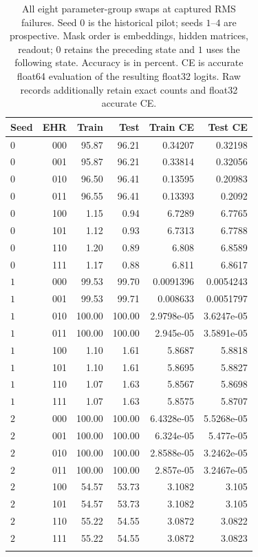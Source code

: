 \begin{table}[htbp]
\centering\small
\setlength{\tabcolsep}{4pt}
\caption{All eight parameter-group swaps at captured RMS failures. Seed $0$ is the historical pilot; seeds $1$--$4$ are prospective. Mask order is embeddings, hidden matrices, readout; $0$ retains the preceding state and $1$ uses the following state. Accuracy is in percent. CE is accurate float64 evaluation of the resulting float32 logits. Raw records additionally retain exact counts and float32 accurate CE.}
\label{tab:rms-swaps-1}
\begin{tabular}{lrrrrr}
\toprule
Seed & EHR & Train & Test & Train CE & Test CE \\
\midrule
$0$ & 000 & 95.87 & 96.21 & 0.34207 & 0.32198 \\
$0$ & 001 & 95.87 & 96.21 & 0.33814 & 0.32056 \\
$0$ & 010 & 96.50 & 96.41 & 0.13595 & 0.20983 \\
$0$ & 011 & 96.55 & 96.41 & 0.13393 & 0.2092 \\
$0$ & 100 & 1.15 & 0.94 & 6.7289 & 6.7765 \\
$0$ & 101 & 1.12 & 0.93 & 6.7313 & 6.7788 \\
$0$ & 110 & 1.20 & 0.89 & 6.808 & 6.8589 \\
$0$ & 111 & 1.17 & 0.88 & 6.811 & 6.8617 \\
\addlinespace
$1$ & 000 & 99.53 & 99.70 & 0.0091396 & 0.0054243 \\
$1$ & 001 & 99.53 & 99.71 & 0.008633 & 0.0051797 \\
$1$ & 010 & 100.00 & 100.00 & 2.9798e-05 & 3.6247e-05 \\
$1$ & 011 & 100.00 & 100.00 & 2.945e-05 & 3.5891e-05 \\
$1$ & 100 & 1.10 & 1.61 & 5.8687 & 5.8818 \\
$1$ & 101 & 1.10 & 1.61 & 5.8695 & 5.8827 \\
$1$ & 110 & 1.07 & 1.63 & 5.8567 & 5.8698 \\
$1$ & 111 & 1.07 & 1.63 & 5.8575 & 5.8707 \\
\addlinespace
$2$ & 000 & 100.00 & 100.00 & 6.4328e-05 & 5.5268e-05 \\
$2$ & 001 & 100.00 & 100.00 & 6.324e-05 & 5.477e-05 \\
$2$ & 010 & 100.00 & 100.00 & 2.8588e-05 & 3.2462e-05 \\
$2$ & 011 & 100.00 & 100.00 & 2.857e-05 & 3.2467e-05 \\
$2$ & 100 & 54.57 & 53.73 & 3.1082 & 3.105 \\
$2$ & 101 & 54.57 & 53.73 & 3.1082 & 3.105 \\
$2$ & 110 & 55.22 & 54.55 & 3.0872 & 3.0822 \\
$2$ & 111 & 55.22 & 54.55 & 3.0872 & 3.0823 \\
\addlinespace
\bottomrule
\end{tabular}
\end{table}
